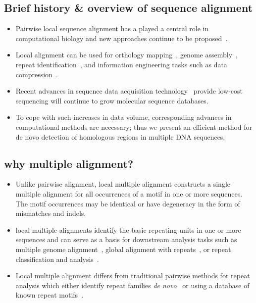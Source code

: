 \documentclass{llncs}
\begin{document}
\subsection{Brief history \& overview of sequence alignment}
\begin{itemize}

\item Pairwise local sequence alignment has a played a central role 
in computational biology and new approaches continue to be
proposed~\cite{ref-pattern,ref-chaos,ref-yass,ref-kahveciMAP}.

\item Local alignment can be used for orthology
mapping~\cite{ref-orthomcl}, genome assembly~\cite{ref-arachne2}, repeat identification~\cite{...},
and information engineering tasks such as data
compression~\cite{ref-ane}.

\item Recent advances in sequence data
acquisition technology~\cite{ref-454} provide low-cost sequencing
will continue to grow molecular sequence
databases.

\item To cope with such increases in data volume, corresponding
advances in computational methods are necessary; thus we present
an efficient method for de novo detection of homologous regions in multiple DNA sequences.

\end{itemize}

\subsection{why multiple alignment?}
\begin{itemize}

\item Unlike pairwise alignment, local multiple alignment constructs a
single multiple alignment for all occurrences of a motif in one or
more sequences.  The motif occurrences may be identical or have
degeneracy in the form of mismatches and indels.

\item local multiple alignments identify the basic repeating units in one or
more sequences and can serve as a basis for downstream analysis
tasks such as multiple genome
alignment~\cite{ref-mauve,ref-mga,ref-mgcat,ref-deweyReview}, global
alignment with repeats~\cite{ref-otherSammethPaper,ref-aba}, or
repeat classification and analysis~\cite{ref-piler}.

\item Local multiple
alignment differs from traditional pairwise methods for repeat
analysis which either identify repeat families \textit{de
novo}~\cite{ref-reputer} or using a database of known repeat
motifs~\cite{ref-repbase}.

\end{itemize}
\end{document}
